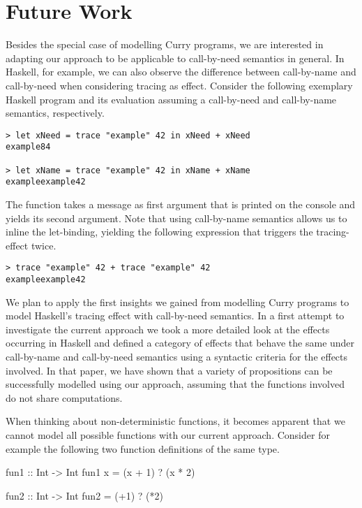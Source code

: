 \section{Future Work}

Besides the special case of modelling Curry programs, we are interested in adapting our approach to be applicable to call\--by\--need semantics in general.
In Haskell, for example, we can also observe the difference between call\--by\--name and call\--by\--need when considering tracing as effect.
Consider the following exemplary Haskell program and its evaluation assuming a call\--by\--need and call\--by\--name semantics, respectively.

\begin{verbatim}
> let xNeed = trace "example" 42 in xNeed + xNeed
example84

> let xName = trace "example" 42 in xName + xName
exampleexample42
\end{verbatim}

The function  takes a message as first argument that is printed on the console and yields its second argument.
Note that using call\--by\--name semantics allows us to inline the let\--binding, yielding the following expression that triggers the tracing\--effect twice.

\begin{verbatim}
> trace "example" 42 + trace "example" 42
exampleexample42
\end{verbatim}

We plan to apply the first insights we gained from modelling Curry programs to model Haskell's tracing effect with call\--by\--need semantics.
In a first attempt to investigate the current approach \citep{christiansen2019verifying} we took a more detailed look at the effects occurring in Haskell and defined a category of effects that behave the same under call\--by\--name and call\--by\--need semantics using a syntactic criteria for the effects involved.
In that paper, we have shown that a variety of propositions can be successfully modelled using our approach, assuming that the functions involved do not share computations.

When thinking about non\--deterministic functions, it becomes apparent that we cannot model all possible functions with our current approach.
Consider for example the following two function definitions of the same type.

\begin{curry}
fun1 :: Int -> Int
fun1 x = (x + 1) ? (x * 2)

fun2 :: Int -> Int
fun2 = (+1) ? (*2)
\end{curry}


